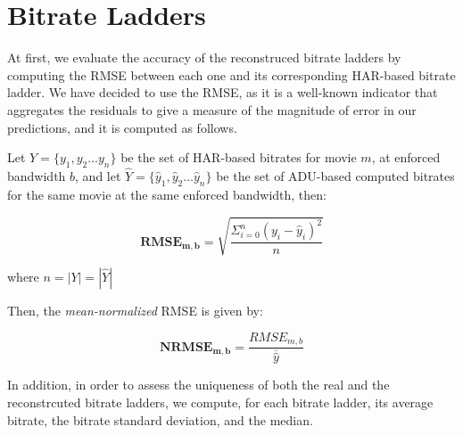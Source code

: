 \section{Bitrate Ladders}

At first, we evaluate the accuracy of the reconstruced bitrate ladders by
computing the RMSE between each one and its corresponding HAR-based bitrate
ladder. We have decided to use the RMSE, as it is a well-known indicator that
aggregates the residuals to give a measure of the magnitude of error in our
predictions, and it is computed as follows.

Let $Y=\{y_1, y_2 \dots y_n\}$ be the set of HAR-based bitrates for movie $m$,
at enforced bandwidth $b$, and let $\hat{Y}=\{\hat{y}_1, \hat{y}_2 \dots
\hat{y}_n\}$ be the set of ADU-based computed bitrates for the same movie at
the same enforced bandwidth, then:

\begin{equation*}
    \mathbf{RMSE_{m, b}} = \sqrt{\dfrac{\Sigma_{i=0}^{n}(y_i - \hat{y}_i)^2}{n}}
\end{equation*}

where $n = |Y| = |\hat{Y}|$

Then, the \emph{mean-normalized} RMSE is given by:

\begin{equation*}
    \mathbf{NRMSE_{m, b}} = \dfrac{RMSE_{m, b}}{\overline{\hat{y}}}
\end{equation*}

In addition, in order to assess the uniqueness of both the real and the
reconstrcuted bitrate ladders, we compute, for each bitrate ladder, its average
bitrate, the bitrate standard deviation, and the median.


